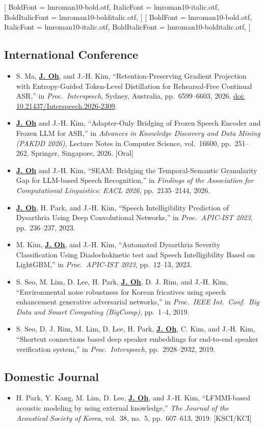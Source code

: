 \documentclass[a4paper,9pt]{extarticle}
\newcommand{\setseriffonts}{%
  \setmainfont{lmroman10-regular.otf}[
    BoldFont = lmroman10-bold.otf,
    ItalicFont = lmroman10-italic.otf,
    BoldItalicFont = lmroman10-bolditalic.otf,
  ]%
  \setmainhangulfont{lmroman10-regular.otf}[
    BoldFont = lmroman10-bold.otf,
    ItalicFont = lmroman10-italic.otf,
    BoldItalicFont = lmroman10-bolditalic.otf,
  ]%
}
\newenvironment{latinblock}{%
  \begingroup\setseriffonts
}{%
  \endgroup
}
\newenvironment{blockitems}{%
  \begin{itemize}[leftmargin=1.5em, itemsep=7pt, topsep=4pt, parsep=0pt, partopsep=0pt]
}{%
  \end{itemize}
}
\newcommand{\me}[1]{\textbf{\underline{#1}}}
\begin{document}
\begin{latinblock}
\subsection*{International Conference}
\begin{blockitems}
  \item S. Ma, \me{J. Oh}, and J.-H. Kim, ``Retention-Preserving Gradient Projection with Entropy-Guided Token-Level Distillation for Rehearsal-Free Continual ASR,'' in \textit{Proc.\ Interspeech}, Sydney, Australia, pp.~6599--6603, 2026. \href{https://doi.org/10.21437/Interspeech.2026-2309}{doi: 10.21437/Interspeech.2026-2309}.
  \item \me{J. Oh} and J.-H. Kim, ``Adapter-Only Bridging of Frozen Speech Encoder and Frozen LLM for ASR,'' in \textit{Advances in Knowledge Discovery and Data Mining (PAKDD 2026)}, Lecture Notes in Computer Science, vol.~16600, pp.~251--262, Springer, Singapore, 2026. [Oral]
  \item \me{J. Oh} and J.-H. Kim, ``SEAM: Bridging the Temporal-Semantic Granularity Gap for LLM-based Speech Recognition,'' in \textit{Findings of the Association for Computational Linguistics: EACL 2026}, pp.~2135--2144, 2026.
  \item \me{J. Oh}, H. Park, and J.-H. Kim, ``Speech Intelligibility Prediction of Dysarthria Using Deep Convolutional Networks,'' in \textit{Proc.\ APIC-IST 2023}, pp.~236--237, 2023.
  \item M. Kim, \me{J. Oh}, and J.-H. Kim, ``Automated Dysarthria Severity Classification Using Diadochokinetic test and Speech Intelligibility Based on LightGBM,'' in \textit{Proc.\ APIC-IST 2023}, pp.~12--13, 2023.
  \item S. Seo, M. Lim, D. Lee, H. Park, \me{J. Oh}, D. J. Rim, and J.-H. Kim, ``Environmental noise robustness for Korean fricatives using speech enhancement generative adversarial networks,'' in \textit{Proc.\ IEEE Int.\ Conf.\ Big Data and Smart Computing (BigComp)}, pp.~1--4, 2019.
  \item S. Seo, D. J. Rim, M. Lim, D. Lee, H. Park, \me{J. Oh}, C. Kim, and J.-H. Kim, ``Shortcut connections based deep speaker embeddings for end-to-end speaker verification system,'' in \textit{Proc.\ Interspeech}, pp.~2928--2932, 2019.
\end{blockitems}

\subsection*{Domestic Journal}
\begin{blockitems}
  \item H. Park, Y. Kang, M. Lim, D. Lee, \me{J. Oh}, and J.-H. Kim, ``LFMMI-based acoustic modeling by using external knowledge,'' \textit{The Journal of the Acoustical Society of Korea}, vol.~38, no.~5, pp.~607--613, 2019. [KSCI/KCI]
\end{blockitems}
\end{latinblock}
\end{document}
